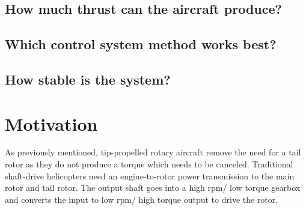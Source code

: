     \subsection{How much thrust can the aircraft produce?}
    \subsection{Which control system method works best?}
    \subsection{How stable is the system?}
    
\section{Motivation}
    As previously mentioned, tip-propelled rotary aircraft remove the need for a tail rotor as they do not produce a torque which needs to be canceled. Traditional shaft-drive helicopters need an engine-to-rotor power transmission to the main rotor and  tail rotor. The output shaft goes into a high rpm/ low torque gearbox and converts the input to low rpm/ high torque output to drive the rotor. 